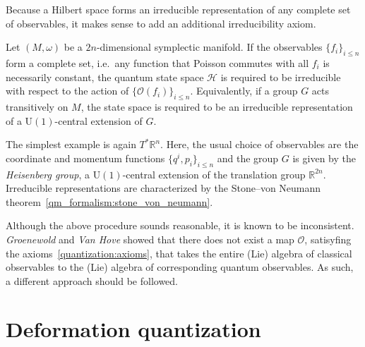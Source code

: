     Because a Hilbert space forms an irreducible representation of any complete set of observables, it makes sense to add an additional irreducibility axiom.
    \begin{axiom}
        Let $(M,\omega)$ be a $2n$-dimensional symplectic manifold. If the observables $\{f_i\}_{i\leq n}$ form a complete set, i.e.~any function that Poisson commutes with all $f_i$ is necessarily constant, the quantum state space $\mathcal{H}$ is required to be irreducible with respect to the action of $\{\mathcal{O}(f_i)\}_{i\leq n}$. Equivalently, if a group $G$ acts transitively on $M$, the state space is required to be an irreducible representation of a $\mathrm{U}(1)$-central extension of $G$.
    \end{axiom}

    The simplest example is again $T^*\mathbb{R}^n$. Here, the usual choice of observables are the coordinate and momentum functions $\{q^i,p_i\}_{i\leq n}$ and the group $G$ is given by the \textit{Heisenberg group}, a $\mathrm{U}(1)$-central extension of the translation group $\mathbb{R}^{2n}$. Irreducible representations are characterized by the Stone--von Neumann theorem~\ref{qm_formalism:stone_von_neumann}.

    Although the above procedure sounds reasonable, it is known to be inconsistent. \textit{Groenewold} and \textit{Van Hove} showed that there does not exist a map $\mathcal{O}$, satisyfing the axioms~\ref{quantization:axioms}, that takes the entire (Lie) algebra of classical observables to the (Lie) algebra of corresponding quantum observables. As such, a different approach should be followed.

\section{Deformation quantization}


